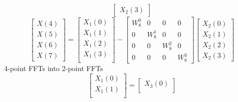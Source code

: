 \documentclass[journal,12pt,twocolumn]{IEEEtran}
\renewcommand\thesection{\arabic{section}}
\begin{document}
\begin{enumerate}[label=\arabic*.,ref=\thesection.\theenumi]
\begin{equation}
\begin{bmatrix}
                     X_{2}(3)
                \end{bmatrix}
           \end{equation}
           \begin{equation}
                \begin{bmatrix}
                     X(4) \\
                     X(5) \\
                     X(6) \\
                     X(7)
                \end{bmatrix}
                =
                \begin{bmatrix}
                     X_{1}(0) \\
                     X_{1}(1) \\
                     X_{1}(2) \\
                     X_{1}(3) \\
                \end{bmatrix}
                -
                \begin{bmatrix}
                     W^{0}_{8} & 0         & 0         & 0         \\
                     0         & W^{1}_{8} & 0         & 0         \\
                     0         & 0         & W^{2}_{8} & 0         \\
                     0         & 0         & 0         & W^{3}_{8}
                \end{bmatrix}
                \begin{bmatrix}
                     X_{2}(0) \\
                     X_{2}(1) \\
                     X_{2}(2) \\
                     X_{2}(3)
                \end{bmatrix}
           \end{equation}
           4-point FFTs into 2-point FFTs
           \begin{equation}
                \begin{bmatrix}
                     X_{1}(0) \\
                     X_{1}(1) \\
                \end{bmatrix}
                =
                \begin{bmatrix}
                     X_{3}(0) \\

\end{bmatrix}
\end{equation}
\end{enumerate}
\end{document}
